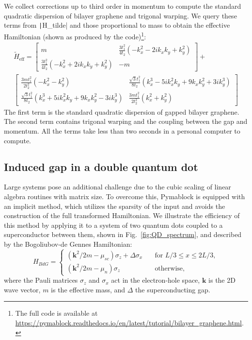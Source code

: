 We collect corrections up to third order in momentum to compute the standard
quadratic dispersion of bilayer graphene and trigonal warping.
We query these terms from \texttt|H_tilde| and those proportional
to mass to obtain the effective Hamiltonian (shown as produced by the
code)\footnote{The full code is available at
\url{https://pymablock.readthedocs.io/en/latest/tutorial/bilayer_graphene.html}.}:
%
{\small
\begin{gather}
\tilde{H}_{\textrm{eff}} =
\begin{bmatrix}
m & \frac{3 t_1^2}{4 t_2} ( - k_x^2 - 2ik_x k_y + k_y^2) \\
\frac{3 t_1^2}{4 t_2} ( - k_x^2 + 2ik_x k_y + k_y^2) & -m
\end{bmatrix} + \nonumber \\
\begin{bmatrix}
\frac{3 m t_1^2}{2 t_2^2} ( - k_x^2 - k_y^2) & \frac{\sqrt{3} t_1^2}{8 t_2} (k_x^3 - 5ik_x^2 k_y + 9 k_x k_y^2 + 3ik_y^3) \\
\frac{\sqrt{3} t_1^2}{8 t_2} (k_x^3 + 5ik_x^2 k_y + 9 k_x k_y^2 - 3ik_y^3) & \frac{3 m t_1^2}{2 t_2^2} (k_x^2 + k_y^2)
\end{bmatrix} \nonumber
\end{gather}
}
%
The first term is the standard quadratic dispersion of gapped bilayer
graphene.
The second term contains trigonal warping and the coupling between the gap and
momentum.
All the terms take less than two seconds in a personal computer to compute.

\subsection{Induced gap in a double quantum dot}

Large systems pose an additional challenge due to the cubic scaling of linear
algebra routines with matrix size.
To overcome this, Pymablock is equipped with an implicit method, which utilizes
the sparsity of the input and avoids the construction of the full transformed
Hamiltonian.
We illustrate the efficiency of this method by applying it to a system of two
quantum dots coupled to a superconductor between them, shown in
Fig.~\ref{fig:QD_spectrum}, and described by the Bogoliubov-de Gennes Hamiltonian:
%
\begin{equation}
    H_{BdG} =
    \begin{cases}
        (\mathbf{k}^2/2m - \mu_{sc}) \sigma_z + \Delta \sigma_x \quad & \text{for } L/3 \leq x \leq 2L/3, \\
        (\mathbf{k}^2/2m - \mu_n) \sigma_z \quad & \text{otherwise},
    \end{cases}
\end{equation}
where the Pauli matrices $\sigma_z$ and $\sigma_x$ act in the electron-hole
space, $\mathbf{k}$ is the 2D wave vector, $m$ is the effective mass, and
$\Delta$ the superconducting gap.

